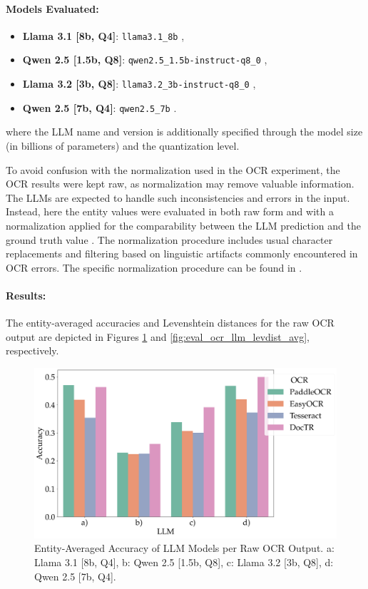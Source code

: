 \documentclass[11pt]{article}
\begin{document}
\paragraph{Models Evaluated:}
\begin{itemize}
    \item \textbf{Llama 3.1 [8b, Q4]}: \texttt{llama3.1\_8b} \cite{touvron2023},
    \item \textbf{Qwen 2.5 [1.5b, Q8]}: \texttt{qwen2.5\_1.5b-instruct-q8\_0} \cite{qwen2025},
    \item \textbf{Llama 3.2 [3b, Q8]}: \texttt{llama3.2\_3b-instruct-q8\_0} \cite{touvron2023},
    \item \textbf{Qwen 2.5 [7b, Q4]}: \texttt{qwen2.5\_7b} \cite{qwen2025}.
\end{itemize}
where the LLM name and version is additionally specified through the model size (in billions of parameters) and the quantization level.


To avoid confusion with the normalization used in the OCR experiment, the OCR results were kept raw, as normalization may remove valuable information. The LLMs are expected to handle such inconsistencies and errors in the input. Instead, here the entity values were evaluated in both raw form and with a normalization applied for the comparability between the LLM prediction and the ground truth value . The normalization procedure includes usual character replacements and filtering based on linguistic artifacts commonly encountered in OCR errors. The specific normalization procedure can be found in .
\paragraph{Results:}
The entity-averaged accuracies and Levenshtein distances for the raw OCR output are depicted in Figures \ref{fig:eval_ocr_llm_accuracies_avg} and \ref{fig:eval_ocr_llm_levdist_avg}, respectively.

\begin{figure}[h!]
    \centering
    \includegraphics[width=0.8\linewidth]{figures/avg_accuracies.png}
    \caption{Entity-Averaged Accuracy of LLM Models per Raw OCR Output. a: Llama 3.1 [8b, Q4], b: Qwen 2.5 [1.5b, Q8], c: Llama 3.2 [3b, Q8], d: Qwen 2.5 [7b, Q4].}
    \label{fig:eval_ocr_llm_accuracies_avg}
\end{figure}
\end{document}

